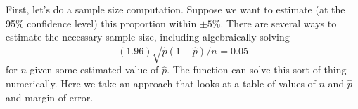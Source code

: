 First, let's do a sample size computation.  Suppose we want to 
estimate (at the 95\% confidence level) this proportion within $\pm 5$\%.
There are several ways to estimate the necessary sample size, including
algebraically solving
\[
(1.96) \sqrt{ \hat p (1-\hat p) /n} = 0.05
\]
for $n$ given some estimated value of $\hat p$.  The  function
can solve this sort of thing numerically.  Here we take an approach 
that looks at a table of values of $n$ and $\hat p$ and margin of error.
\begin{knitrout}
\end{knitrout}
